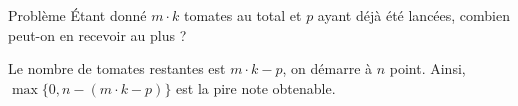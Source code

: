 \begin{frame}
    \frametitle{\problemtitle}
    \begin{block}{Problème}
        Étant donné $m \cdot k$ tomates au total et $p$ ayant déjà été lancées, combien peut-on en recevoir au plus ?
    \end{block}
    \pause
    Le nombre de tomates restantes est $m \cdot k - p$, on démarre à $n$ point. Ainsi, $\max\{0, n - (m \cdot k - p)\}$ est la pire note obtenable.
    \pause\solvestats
\end{frame}
